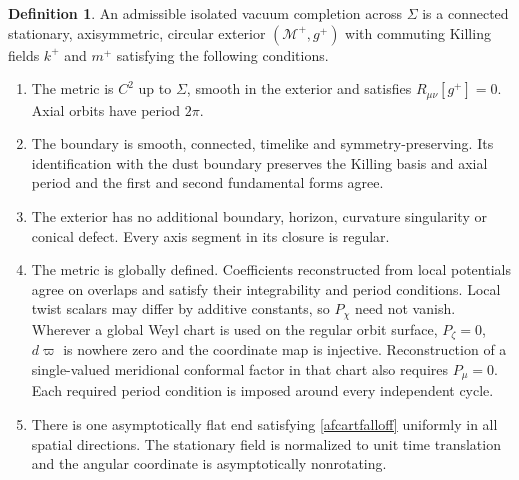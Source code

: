 \documentclass[amsmath,amsfonts,amssymb,aps,pra,superscriptaddress,10pt]{revtex4-2}
\numberwithin{equation}{section}
\theoremstyle{plain}
\theoremstyle{definition}
\newtheorem{definition}{Definition}
\theoremstyle{remark}
\theoremstyle{definition}
\begin{document}
\begin{definition}\label{defadmvaccompl}
An admissible isolated vacuum completion across $\Sigma$ is a connected stationary, axisymmetric, circular exterior $(\mathcal{M}^+,g^+)$ with commuting Killing fields $k^+$ and $m^+$ satisfying the following conditions.
\begin{enumerate}
\item
The metric is $C^2$ up to $\Sigma$, smooth in the exterior and
satisfies $R_{\mu\nu}[g^+]=0$. Axial orbits have period $2\pi$.
\item
The boundary is smooth, connected, timelike and symmetry-preserving.
Its identification with the dust boundary preserves the Killing basis and axial period and the first and second fundamental forms agree.
\item
The exterior has no additional boundary, horizon, curvature
singularity or conical defect. Every axis segment in its closure is
regular.
\item
The metric is globally defined. Coefficients reconstructed from local potentials agree on overlaps and satisfy their integrability and period conditions. Local twist scalars may differ by additive constants, so $P_\chi$ need not vanish. Wherever a global Weyl chart is used on the regular orbit surface, $P_\zeta=0$, $d\varpi$ is nowhere zero and the coordinate map is injective. Reconstruction of a single-valued meridional conformal factor in that chart also requires $P_\mu=0$. Each required period condition is imposed around every independent cycle.
\item
There is one asymptotically flat end satisfying \eqref{afcartfalloff} uniformly in all spatial directions. The stationary field is normalized to unit time translation and the angular coordinate is asymptotically nonrotating.
\end{enumerate}
\end{definition}
\end{document}
